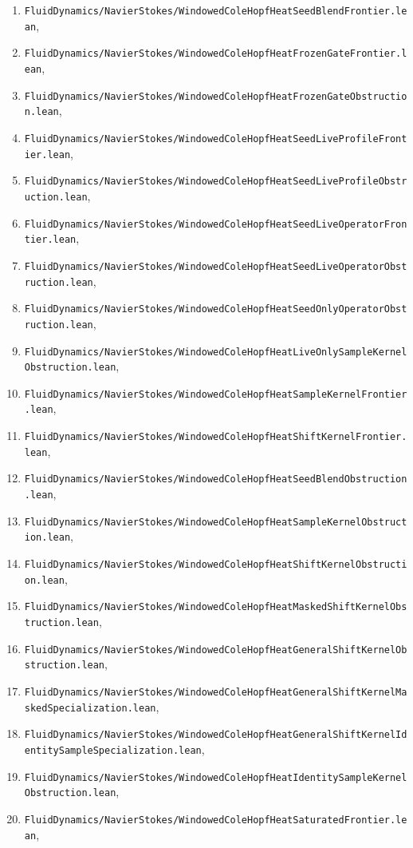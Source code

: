 \documentclass[11pt]{article}
\begin{document}
\begin{enumerate}[leftmargin=1.5em]
  \item \texttt{FluidDynamics/NavierStokes/WindowedColeHopfHeatSeedBlendFrontier.lean},
  \item \texttt{FluidDynamics/NavierStokes/WindowedColeHopfHeatFrozenGateFrontier.lean},
  \item \texttt{FluidDynamics/NavierStokes/WindowedColeHopfHeatFrozenGateObstruction.lean},
  \item \texttt{FluidDynamics/NavierStokes/WindowedColeHopfHeatSeedLiveProfileFrontier.lean},
  \item \texttt{FluidDynamics/NavierStokes/WindowedColeHopfHeatSeedLiveProfileObstruction.lean},
  \item \texttt{FluidDynamics/NavierStokes/WindowedColeHopfHeatSeedLiveOperatorFrontier.lean},
  \item \texttt{FluidDynamics/NavierStokes/WindowedColeHopfHeatSeedLiveOperatorObstruction.lean},
  \item \texttt{FluidDynamics/NavierStokes/WindowedColeHopfHeatSeedOnlyOperatorObstruction.lean},
  \item \texttt{FluidDynamics/NavierStokes/WindowedColeHopfHeatLiveOnlySampleKernelObstruction.lean},
  \item \texttt{FluidDynamics/NavierStokes/WindowedColeHopfHeatSampleKernelFrontier.lean},
  \item \texttt{FluidDynamics/NavierStokes/WindowedColeHopfHeatShiftKernelFrontier.lean},
  \item \texttt{FluidDynamics/NavierStokes/WindowedColeHopfHeatSeedBlendObstruction.lean},
  \item \texttt{FluidDynamics/NavierStokes/WindowedColeHopfHeatSampleKernelObstruction.lean},
  \item \texttt{FluidDynamics/NavierStokes/WindowedColeHopfHeatShiftKernelObstruction.lean},
  \item \texttt{FluidDynamics/NavierStokes/WindowedColeHopfHeatMaskedShiftKernelObstruction.lean},
  \item \texttt{FluidDynamics/NavierStokes/WindowedColeHopfHeatGeneralShiftKernelObstruction.lean},
  \item \texttt{FluidDynamics/NavierStokes/WindowedColeHopfHeatGeneralShiftKernelMaskedSpecialization.lean},
  \item \texttt{FluidDynamics/NavierStokes/WindowedColeHopfHeatGeneralShiftKernelIdentitySampleSpecialization.lean},
  \item \texttt{FluidDynamics/NavierStokes/WindowedColeHopfHeatIdentitySampleKernelObstruction.lean},
  \item \texttt{FluidDynamics/NavierStokes/WindowedColeHopfHeatSaturatedFrontier.lean},

\end{enumerate}
\end{document}
